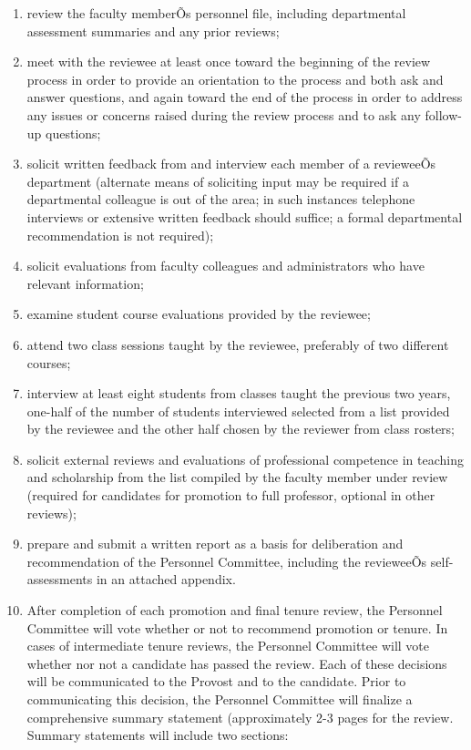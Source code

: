 \documentclass[letterpaper, 11pt]{article}
\begin{document}
				\begin{enumerate}[label=\arabic*)]
					\item{review the faculty memberÕs personnel file, including departmental assessment summaries and any prior reviews;}
					\item{meet with the reviewee at least once toward the beginning of the review process in order to provide an orientation to the process and both ask and answer questions, and again toward the end of the process in order to address any issues or concerns raised during the review process and to ask any follow-up questions;}
					\item{solicit written feedback from and interview each member of a revieweeÕs department (alternate means of soliciting input may be required if a departmental colleague is out of the area; in such instances telephone interviews or extensive written feedback should suffice; a formal departmental recommendation is not required);}
					\item{solicit evaluations from faculty colleagues and administrators who have relevant information;}
					\item{examine student course evaluations provided by the reviewee;}
					\item{attend two class sessions taught by the reviewee, preferably of two different courses;}
					\item{interview at least eight students from classes taught the previous two years, one-half of the number of students interviewed selected from a list provided by the reviewee and the other half chosen by the reviewer from class rosters;}
					\item{solicit external reviews and evaluations of professional competence in teaching and scholarship from the list compiled by the faculty member under review (required for candidates for promotion to full professor, optional in other reviews);}
					\item{prepare and submit a written report as a basis for deliberation and recommendation of the Personnel Committee, including the revieweeÕs self-assessments in an attached appendix.}
					\item{After completion of each promotion and final tenure review, the Personnel Committee will vote whether or not to recommend promotion or tenure.  In cases of intermediate tenure reviews, the Personnel Committee will vote whether nor not a candidate has passed the review.  Each of these decisions will be communicated to the Provost and to the candidate.  Prior to communicating this decision, the Personnel Committee will finalize a comprehensive summary statement (approximately 2-3 pages for the review.  Summary statements will include two sections:
}
\end{enumerate}
\end{document}
